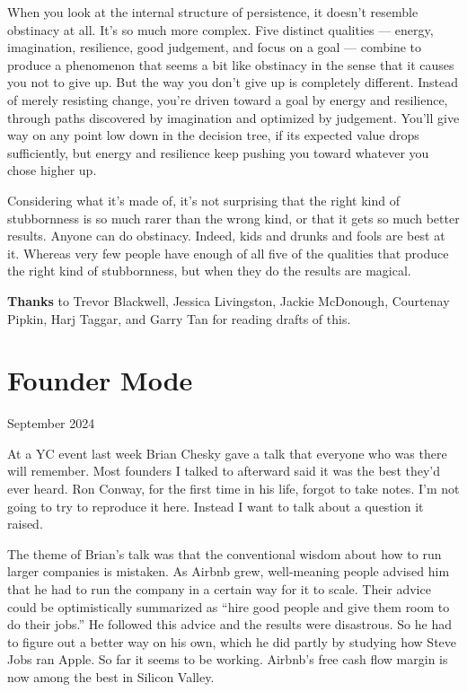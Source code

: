 \documentclass[12pt]{book}
\begin{document}
When you look at the internal structure of persistence, it doesn't
resemble obstinacy at all. It's so much more complex. Five distinct
qualities --- energy, imagination, resilience, good judgement, and focus
on a goal --- combine to produce a phenomenon that seems a bit like
obstinacy in the sense that it causes you not to give up. But the way
you don't give up is completely different. Instead of merely resisting
change, you're driven toward a goal by energy and resilience, through
paths discovered by imagination and optimized by judgement. You'll give
way on any point low down in the decision tree, if its expected value
drops sufficiently, but energy and resilience keep pushing you toward
whatever you chose higher up.

Considering what it's made of, it's not surprising that the right kind
of stubbornness is so much rarer than the wrong kind, or that it gets so
much better results. Anyone can do obstinacy. Indeed, kids and drunks
and fools are best at it. Whereas very few people have enough of all
five of the qualities that produce the right kind of stubbornness, but
when they do the results are magical.


\textbf{Thanks} to Trevor Blackwell, Jessica Livingston, Jackie
McDonough, Courtenay Pipkin, Harj Taggar, and Garry Tan for reading
drafts of this.
\chapter{Founder Mode}

September 2024

At a YC event last week Brian Chesky gave a talk that everyone who was
there will remember. Most founders I talked to afterward said it was the
best they'd ever heard. Ron Conway, for the first time in his life,
forgot to take notes. I'm not going to try to reproduce it here. Instead
I want to talk about a question it raised.

The theme of Brian's talk was that the conventional wisdom about how to
run larger companies is mistaken. As Airbnb grew, well-meaning people
advised him that he had to run the company in a certain way for it to
scale. Their advice could be optimistically summarized as ``hire good
people and give them room to do their jobs.'' He followed this advice
and the results were disastrous. So he had to figure out a better way on
his own, which he did partly by studying how Steve Jobs ran Apple. So
far it seems to be working. Airbnb's free cash flow margin is now among
the best in Silicon Valley.
\end{document}
